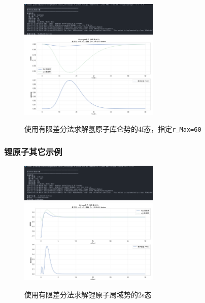 \begin{figure}[H]
    \centering
    \includegraphics[width=0.6\textwidth]{Problem_2/figs/h_fd_4f_terminal.png}
    \includegraphics[width=0.6\textwidth]{Problem_2/figs/h_fd_4f.png}
    \caption{使用有限差分法求解氢原子库仑势的4f态，指定\texttt{r\_Max=60}}
\end{figure}

\subsubsection{锂原子其它示例}
\begin{figure}[H]
    \centering
    \includegraphics[width=0.6\textwidth]{Problem_2/figs/li_fd_2s_terminal.png}
    \includegraphics[width=0.6\textwidth]{Problem_2/figs/li_fd_2s.png}
    \caption{使用有限差分法求解锂原子局域势的2s态}
\end{figure}

